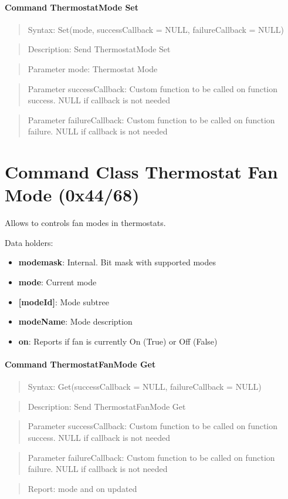 \paragraph{Command ThermostatMode Set}
\begin{quote}Syntax: Set(mode, successCallback = NULL, failureCallback = NULL)\end{quote}
\begin{quote}Description: Send ThermostatMode Set\end{quote}
\begin{quote}Parameter mode: Thermostat Mode\end{quote}
\begin{quote}Parameter successCallback: Custom function to be called on function success. NULL if callback is not needed\end{quote}
\begin{quote}Parameter failureCallback: Custom function to be called on function failure. NULL if callback is not needed\end{quote}



\section{Command Class Thermostat Fan Mode (0x44/68)}

Allows to controls fan modes in thermostats.
\newline

\noindent
Data holders:

\begin{itemize}
\item \textbf{modemask}: Internal. Bit mask with supported modes
\item \textbf{mode}: Current mode
\item \textbf{[modeId]}: Mode subtree
\item \qquad\textbf{modeName}: Mode description
\item \textbf{on}: Reports if fan is currently On (True) or Off (False)
\end{itemize}

\paragraph{Command ThermostatFanMode Get}
\begin{quote}Syntax: Get(successCallback = NULL, failureCallback = NULL)\end{quote}
\begin{quote}Description: Send ThermostatFanMode Get\end{quote}
\begin{quote}Parameter successCallback: Custom function to be called on function success. NULL if callback is not needed\end{quote}
\begin{quote}Parameter failureCallback: Custom function to be called on function failure. NULL if callback is not needed\end{quote}
\begin{quote}Report: mode and on updated\end{quote}

